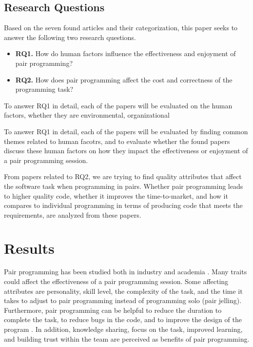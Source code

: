 \documentclass[conference]{IEEEtran}
\begin{document}
\subsection{Research Questions}

Based on the seven found articles and their categorization, this paper seeks to answer the following two research questions.

\begin{itemize}
    \item \textbf{RQ1.} How do human factors influence the effectiveness and enjoyment of pair programming?
    \item \textbf{RQ2.} How does pair programming affect the cost and correctness of the programming task?
\end{itemize}

To answer RQ1 in detail, each of the papers will be evaluated on the human factors, whether they are environmental, organizational

To answer RQ1 in detail, each of the papers will be evaluated by finding common themes related to human facotrs, and to evaluate whether the found papers discuss these human factors on how they impact the effectiveness or enjoyment of a pair programming session. 

From papers related to RQ2, we are trying to find quality attributes that affect the software task when programming in pairs. Whether pair programming leads to higher quality code, whether it improves the time-to-market, and how it compares to individual programming in terms of producing code that meets the requirements, are analyzed from these papers.

\section{Results}

Pair programming has been studied both in industry and academia \cite{Williams2000Strengthening, 10.1145/1414004.1414026, Hannay2009effectiveness}. Many traits could affect the effectiveness of a pair programming session. Some affecting attributes are personality, skill level, the complexity of the task, and the time it takes to adjust to pair programming instead of programming solo (pair jelling). Furthermore, pair programming can be helpful to reduce the duration to complete the task, to reduce bugs in the code, and to improve the design of the program \cite{10.1145/2652524.2652529}. In addition, knowledge sharing, focus on the task, improved learning, and building trust within the team are perceived as benefits of pair programming.
\end{document}
